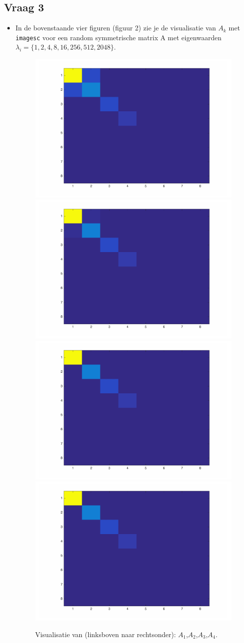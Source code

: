 \documentclass{article}
\begin{document}
\newpage

\subsection*{Vraag 3}
\begin{itemize}
    \item In de bovenstaande vier figuren (figuur 2) zie je de visualisatie van  $A_k$ met \texttt{imagesc} voor een random symmetrische matrix A met eigenwaarden $\lambda_i = \{1,2,4,8,16,256,512,2048\}$.
    
\begin{figure}   
\begin{center}
    \includegraphics[width=.4\textwidth]{im1}
    \includegraphics[width=.4\textwidth]{im2}
    \includegraphics[width=.4\textwidth]{im3}
    \includegraphics[width=.4\textwidth]{im4}
\end{center}
\caption{Visualisatie van (linksboven naar rechtsonder): $A_1$,$A_2$,$A_3$,$A_4$.}
\end{figure}


\end{itemize}
\end{document}
